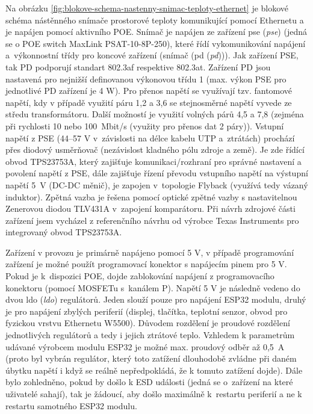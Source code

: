 Na obrázku \ref{fig:blokove-schema-nastenny-snimac-teploty-ethernet} je blokové schéma nástěnného snímače prostorové teploty komunikující pomocí Ethernetu a je napájen pomocí aktivního POE. Snímač je napájen ze zařízení \acrshort{pse} (\textit{\acrlong{pse}}) (jedná se o POE switch MaxLink PSAT-10-8P-250), které řídí vykomunikování napájení a~výkonnostní třídy pro koncové zařízení (snímač (\acrshort{pd} (\textit{\acrlong{pd}}))). Jak zařízení PSE, tak PD podporují standart 802.3af respektive 802.3at. Zařízení PD jsou nastavená pro nejnižší definovanou výkonovou třídu 1 (max. výkon PSE pro jednotlivé PD zařízení je 4 W). Pro přenos napětí se využívají tzv. fantomové napětí, kdy v případě využití páru 1,2 a 3,6 se stejnosměrné napětí vyvede ze středu transformátoru. Další možností je využití volných párů 4,5 a 7,8 (zejména při rychlosti 10 nebo 100~Mbit/s (využity pro přenos dat 2 páry)). Vstupní napětí z PSE (44–57 V v~závislosti na délce kabelu UTP a~ztrátách) prochází přes diodový usměrňovač (nezávislost kladného pólu zdroje a země). Je zde řídící obvod TPS23753A, který zajišťuje komunikaci/rozhraní pro správné nastavení a povolení napětí z PSE, dále zajišťuje řízení převodu vstupního napětí na výstupní napětí 5~V (DC-DC měnič), je zapojen v~topologie Flyback (využívá tedy vázaný induktor). Zpětná vazba je řešena pomocí optické zpětné vazby s nastavitelnou Zenerovou diodou TLV431A v~zapojení komparátoru. Při návrh zdrojové části zařízení jsem vycházel z referenčního návrhu od výrobce Texas Instruments pro integrovaný obvod TPS23753A.

Zařízení v provozu je primárně  napájeno pomocí 5 V, v případě programování zařízení je možné použít programovací konektor s napájecím pinem pro 5 V. Pokud je k~dispozici POE, dojde zablokování napájení z programovacího konektoru (pomocí MOSFETu s~kanálem P). Napětí 5 V je následně vedeno do dvou \acrshort{ldo} (\textit{\acrlong{ldo}}) regulátorů. Jeden slouží pouze pro napájení ESP32 modulu, druhý je pro napájení zbylých periferií (displej, tlačítka, teplotní senzor, obvod pro fyzickou vrstvu Ethernetu W5500). Důvodem rozdělení je proudové rozdělení jednotlivých regulátorů a tedy i jejich ztrátové teplo. Vzhledem k parametrům udávané výrobcem modulu ESP32 je možné max. proudový odběr až 0,5~A (proto byl vybrán regulátor, který toto zatížení dlouhodobě zvládne při daném úbytku napětí i když se reálně nepředpokládá, že k tomuto zatížení dojde). Dále bylo zohledněno, pokud by došlo k ESD události (jedná se o~zařízení na které uživatelé sahají), tak je žádoucí, aby došlo maximálně k~restartu periferií a ne k restartu samotného ESP32 modulu. 

